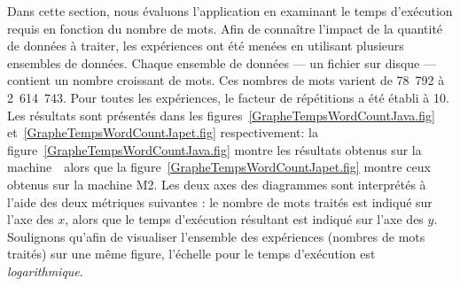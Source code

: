 %
%

Dans cette section, nous 
\'evaluons l'application  en examinant le temps d'ex\'ecution requis en fonction du nombre de mots. Afin de conna\^itre l'impact de la quantit\'e de donn\'ees \`a traiter, les exp\'eriences ont \'et\'e men\'ees en utilisant plusieurs ensembles de donn\'ees. Chaque ensemble de donn\'ees --- un fichier sur disque --- contient un nombre croissant de mots. Ces nombres de mots varient de 78~792 \`a 2~614~743. Pour toutes les exp\'eriences, le facteur de r\'ep\'etitions a \'et\'e \'etabli \`a 10.  Les r\'esultats sont pr\'esent\'es dans les figures~\ref{GrapheTempsWordCountJava.fig} et~\ref{GrapheTempsWordCountJapet.fig} respectivement: la figure~\ref{GrapheTempsWordCountJava.fig} montre les résultats obtenus sur la machine~\ alors que la figure~\ref{GrapheTempsWordCountJapet.fig} montre ceux obtenus sur la machine M2.  Les deux axes des diagrammes sont interpr\'et\'es \`a l'aide des deux m\'etriques suivantes : le nombre de mots trait\'es est indiqu\'e sur l'axe des $x$, alors que le temps d'ex\'ecution r\'esultant est indiqu\'e sur l'axe des $y$.  Soulignons qu'afin de visualiser l'ensemble des exp\'eriences (nombres de mots trait\'es) sur une m\^eme figure, l'\'echelle pour le temps d'ex\'ecution est \emph{logarithmique}. 


